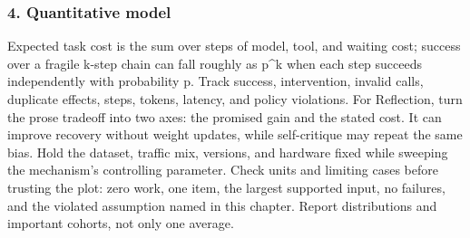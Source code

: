 \subsubsection*{4. Quantitative model}
Expected task cost is the sum over steps of model, tool, and waiting cost; success over a fragile k-step chain can fall roughly as p\textasciicircum{}k when each step succeeds independently with probability p. Track success, intervention, invalid calls, duplicate effects, steps, tokens, latency, and policy violations.
For Reflection, turn the prose tradeoff into two axes: the promised gain and the stated cost. It can improve recovery without weight updates, while self-critique may repeat the same bias. Hold the dataset, traffic mix, versions, and hardware fixed while sweeping the mechanism's controlling parameter.
Check units and limiting cases before trusting the plot: zero work, one item, the largest supported input, no failures, and the violated assumption named in this chapter. Report distributions and important cohorts, not only one average.
